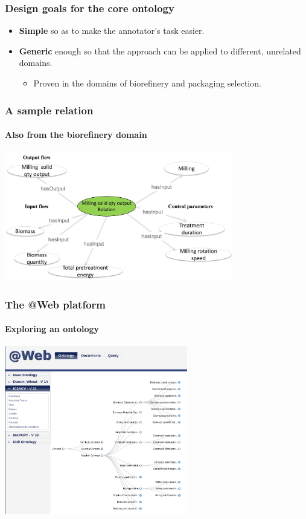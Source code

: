\documentclass{beamer}
\begin{document}
\begin{frame}
  \frametitle{Design goals for the core ontology}

  \begin{itemize}
    \item \textbf{Simple} so as to make the annotator's task easier.

    \pause

    \item \textbf{Generic} enough so that the approach can be applied to different, unrelated domains.

    \pause

    \begin{itemize}
      \item Proven in the domains of biorefinery and packaging selection.
    \end{itemize}
  \end{itemize}
\end{frame}

\begin{frame}
  \frametitle{A sample relation}
  \framesubtitle{Also from the biorefinery domain}

  \begin{center}
    \includegraphics[width=10cm]{relation.jpg}
  \end{center}
\end{frame}

\begin{frame}
  \frametitle{The \textbf{@Web} platform}
  \framesubtitle{Exploring an ontology}

  \begin{center}
    \includegraphics[width=8cm]{atweb-ontology.jpg}
  \end{center}
\end{frame}
\end{document}
